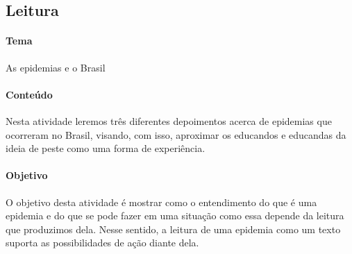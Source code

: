 \documentclass[12pt]{extarticle}
\begin{document}
\subsection{Leitura}



\paragraph{Tema} As epidemias e o Brasil

\paragraph{Conteúdo}

Nesta atividade leremos três diferentes depoimentos acerca de epidemias
que ocorreram no Brasil, visando, com isso, aproximar os educandos e
educandas da ideia de peste como uma forma de experiência.

\paragraph{Objetivo}

O objetivo desta atividade é mostrar como o entendimento do que é uma
epidemia e do que se pode fazer em uma situação como essa depende da
leitura que produzimos dela. Nesse sentido, a leitura de uma epidemia
como um texto suporta as possibilidades de ação diante dela.
\end{document}
